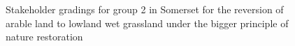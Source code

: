 \documentclass[
  12pt,
  letterpaper,
  DIV=11,
  numbers=noendperiod]{scrartcl}
\begin{document}
\begin{figure}[H]


\caption{\label{fig-SomArMoreG2}Stakeholder gradings for group 2 in
Somerset for the reversion of arable land to lowland wet grassland under
the bigger principle of nature restoration}

\end{figure}%
\end{document}
